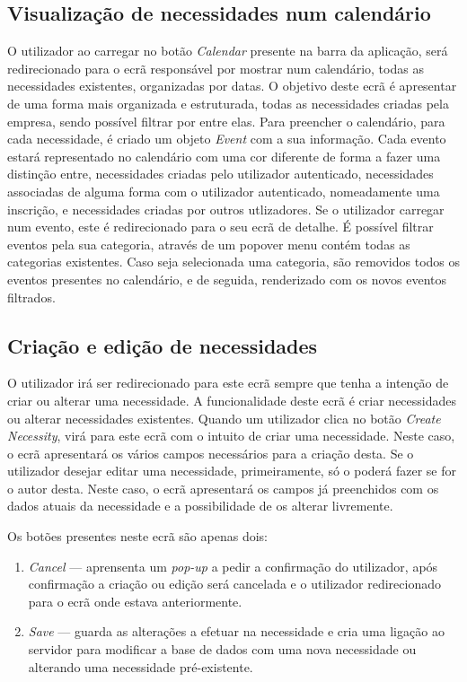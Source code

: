 \documentclass[a4paper,openright,11pt]{report}
\begin{document}
\subsection*{Visualização de necessidades num calendário}\label{sec:calendarNecessitiesView}
O utilizador ao carregar no botão \textit{Calendar} presente na barra da aplicação, será redirecionado para o ecrã responsável por mostrar num calendário, todas as necessidades existentes, organizadas por datas. 
O objetivo deste ecrã é apresentar de uma forma mais organizada e estruturada, todas as necessidades criadas pela empresa, sendo possível filtrar por entre elas. 
Para preencher o calendário, para cada necessidade, é criado um objeto \textit{Event} com a sua informação. 
Cada evento estará representado no calendário com uma cor diferente de forma a fazer uma distinção entre, necessidades criadas pelo utilizador autenticado, necessidades associadas de alguma forma com o utilizador autenticado, nomeadamente uma inscrição, e necessidades criadas por outros utlizadores.
Se o utilizador carregar num evento, este é redirecionado para o seu ecrã de detalhe. 
É possível filtrar eventos pela sua categoria, através de um popover menu contém todas as categorias existentes. 
Caso seja selecionada uma categoria, são removidos todos os eventos presentes no calendário, e de seguida, renderizado com os novos eventos filtrados.

\subsection*{Criação e edição de necessidades}\label{sec:necessityCreation}

O utilizador irá ser redirecionado para este ecrã sempre que tenha a intenção de criar ou alterar uma necessidade.
A funcionalidade deste ecrã é criar necessidades ou alterar necessidades existentes.
Quando um utilizador clica no botão \textit{Create Necessity}, virá para este ecrã com o intuito de criar uma necessidade.
Neste caso, o ecrã apresentará os vários campos necessários para a criação desta.
Se o utilizador desejar editar uma necessidade, primeiramente, só o poderá fazer se for o autor desta.
Neste caso, o ecrã apresentará os campos já preenchidos com os dados atuais da necessidade e a possibilidade de os alterar livremente.

Os botões presentes neste ecrã são apenas dois:
\begin{enumerate}
    \item \textit{Cancel} --- aprensenta um \textit{pop-up} a pedir a confirmação do utilizador, após confirmação a criação ou edição será cancelada e o utilizador redirecionado para o ecrã onde estava anteriormente.
    \item \textit{Save} --- guarda as alterações a efetuar na necessidade e cria uma ligação ao servidor para modificar a base de dados com uma nova necessidade ou alterando uma necessidade pré-existente.
\end{enumerate}
\end{document}
